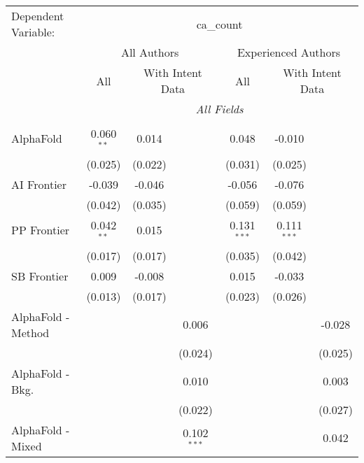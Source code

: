 \begingroup
\centering
\begin{tabular}{lcccccc}
   \tabularnewline \midrule \midrule
   Dependent Variable: & \multicolumn{6}{c}{ca\_count}\\
 & \multicolumn{3}{c}{All Authors} & \multicolumn{3}{c}{Experienced Authors} \\
\cmidrule(lr){2-4} \cmidrule(lr){5-7}
 & \multicolumn{1}{c}{All} & \multicolumn{2}{c}{With Intent Data} & \multicolumn{1}{c}{All} & \multicolumn{2}{c}{With Intent Data} \\
\cmidrule(lr){2-2} \cmidrule(lr){3-4} \cmidrule(lr){5-5} \cmidrule(lr){6-7}
 & \multicolumn{6}{c}{\textit{All Fields}} \\ \\
   AlphaFold            & 0.060$^{**}$ & 0.014   &               & 0.048         & -0.010        &   \\   
                        & (0.025)      & (0.022) &               & (0.031)       & (0.025)       &   \\   
   AI Frontier          & -0.039       & -0.046  &               & -0.056        & -0.076        &   \\   
                        & (0.042)      & (0.035) &               & (0.059)       & (0.059)       &   \\   
   PP Frontier          & 0.042$^{**}$ & 0.015   &               & 0.131$^{***}$ & 0.111$^{***}$ &   \\   
                        & (0.017)      & (0.017) &               & (0.035)       & (0.042)       &   \\   
   SB Frontier          & 0.009        & -0.008  &               & 0.015         & -0.033        &   \\   
                        & (0.013)      & (0.017) &               & (0.023)       & (0.026)       &   \\   
   AlphaFold - Method   &              &         & 0.006         &               &               & -0.028\\   
                        &              &         & (0.024)       &               &               & (0.025)\\   
   AlphaFold - Bkg.     &              &         & 0.010         &               &               & 0.003\\   
                        &              &         & (0.022)       &               &               & (0.027)\\   
   AlphaFold - Mixed    &              &         & 0.102$^{***}$ &               &               & 0.042\\   

\end{tabular}
